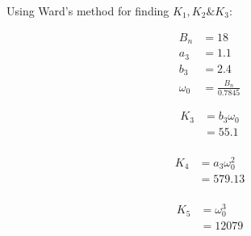 Using Ward's method\cite{Ward} for finding $K_1,K_2 \& K_3$:

\begin{align*}
B_n &= 18\\
a_3&=1.1\\
b_3&=2.4\\
\omega_{0}&=\frac{B_n}{0.7845}
\end{align*}

\begin{equation} \label{eq3}
\begin{split}
K_3 & = b_3  \omega_{0}\\
    & = 55.1\\
\end{split}
\end{equation}

\begin{equation} \label{eq4}
\begin{split}
K_4 & = a_3  \omega_{0}^2\\ 
    & = 579.13\\
\end{split}
\end{equation}

\begin{equation} \label{eq5}
\begin{split}
K_5 & = \omega_{0}^3\\
    & = 12079\\
\end{split}
\end{equation}


\begin{comment}
The next stage of Laplace domain analysis after determining the transfer function of the filter is to determine the transfer function of the closed loop system.

Multiplying equation \ref{eq6} by $\frac{s^2}{s^2}$ we get :

\begin{equation}
G(s) = \frac{K_3s^2 + K_4 s + K_5}{s^2}
\end{equation}

The \ac{VCO} has the following transfer function : $G(s) = \frac{K_{vco}}{s}$

\begin{equation}
 H(s) = \frac{K_{VCO}(K_1 + \frac{K_2}{s} + \frac{K_3}{s^2})}{s+K_{VCO}(K_1 + \frac{K_2}{s} + \frac{K_3}{s^2})}
\end{equation}

Multiplying by $\frac{s^2}{s^2}$ we get :

\begin{equation}
 H(s) = \frac{K_{VCO}(K_1s^2 + K_2s + K_3)}{s^3+K_{VCO}(K_1s^2 + K_2s + K_3)}
 \end{equation}
\end{comment}


